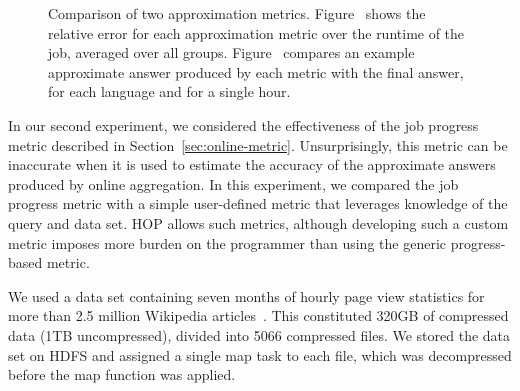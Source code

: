 \begin{figure}[ht]
  \centering
  \caption{Comparison of two approximation
    metrics. Figure~\protect{} shows the relative error for
    each approximation metric over the runtime of the job, averaged over all
    groups. Figure~\protect{} compares an example approximate
    answer produced by each metric with the final answer, for each language and for a single hour.}
\label{fig:approx}
\end{figure}

In our second experiment, we considered the effectiveness of the job progress
metric described in Section~\ref{sec:online-metric}. Unsurprisingly, this metric
can be inaccurate when it is used to estimate the accuracy of the approximate
answers produced by online aggregation. In this experiment, we compared the job
progress metric with a simple user-defined metric that leverages knowledge of
the query and data set. HOP allows such metrics, although developing such a
custom metric imposes more burden on the programmer than using the generic
progress-based metric.

We used a data set containing seven months of hourly page view statistics for
more than 2.5 million Wikipedia articles~\cite{wikistats}. This constituted
320GB of compressed data (1TB uncompressed), divided into 5066 compressed
files. We stored the data set on HDFS and assigned a single map task to each
file, which was decompressed before the map function was applied.

